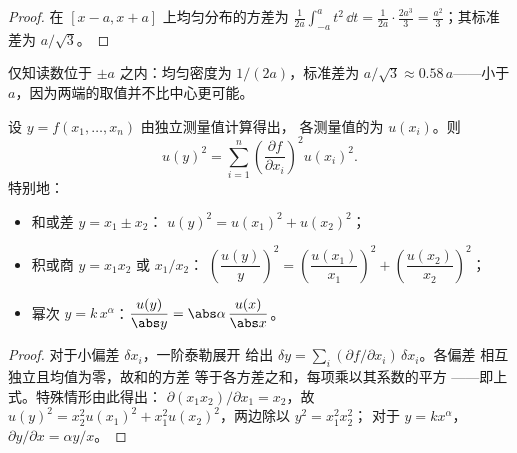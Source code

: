 \begin{proof}
在 $[x - a, x + a]$ 上均匀分布的方差为
$\frac{1}{2a}\int_{-a}^{a} t^2\,\dd t = \frac{1}{2a}\cdot\frac{2a^3}{3}
= \frac{a^2}{3}$；其标准差为 $a/\sqrt3$。
\end{proof}

\begin{omfigure}

{\small 仅知读数位于 $\pm a$ 之内：均匀密度为
$1/(2a)$，标准差为 $a/\sqrt3 \approx 0.58\,a$——小于
$a$，因为两端的取值并不比中心更可能。}
\end{omfigure}

\begin{theorem}[合成不确定度]\label{thm:b1:units-dimensions:propagation}
设 $y = f(x_1, \dots, x_n)$ 由独立测量值计算得出，
各测量值的为 $u(x_i)$。则
\[
u(y)^2 = \sum_{i=1}^n \left(\frac{\partial f}{\partial x_i}\right)^2 u(x_i)^2 .
\]
特别地：
\begin{itemize}
  \item 和或差 $y = x_1 \pm x_2$：
        $u(y)^2 = u(x_1)^2 + u(x_2)^2$；
  \item 积或商 $y = x_1 x_2$ 或 $x_1/x_2$：
        $\left(\dfrac{u(y)}{y}\right)^2 = \left(\dfrac{u(x_1)}{x_1}\right)^2
        + \left(\dfrac{u(x_2)}{x_2}\right)^2$；
  \item 幂次 $y = k\,x^\alpha$：$\dfrac{u(y)}{\abs y} = \abs\alpha\,\dfrac{u(x)}{\abs x}$。
\end{itemize}
\end{theorem}

\begin{proof}
对于小偏差 $\delta x_i$，一阶泰勒展开
给出 $\delta y = \sum_i (\partial f/\partial x_i)\,\delta x_i$。各偏差
相互独立且均值为零，故和的方差
等于各方差之和，每项乘以其系数的平方
——即上式。特殊情形由此得出：
$\partial(x_1 x_2)/\partial x_1 = x_2$，故
$u(y)^2 = x_2^2 u(x_1)^2 + x_1^2 u(x_2)^2$，两边除以 $y^2 = x_1^2 x_2^2$；
对于 $y = kx^\alpha$，$\partial y/\partial x = \alpha y/x$。
\end{proof}

